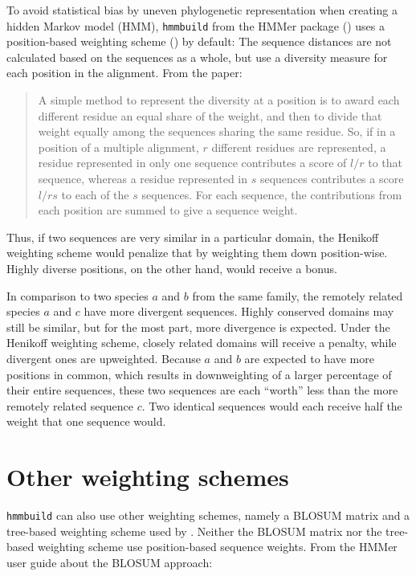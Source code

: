 To avoid statistical bias by uneven phylogenetic representation when creating a
hidden Markov model (HMM), \texttt{hmmbuild} from the HMMer package
(\cite{eddy2009}) uses a position-based weighting scheme (\cite{henikoff1994})
by default: The sequence distances are not calculated based on the sequences as
a whole, but use a diversity measure for each position in the alignment. From
the paper:

\begin{quote}
	A simple method to represent the diversity at a position is to award each
	different residue an equal share of the weight, and then to divide that
	weight equally among the sequences sharing the same residue. So, if in a
	position of a multiple alignment, $r$ different residues are represented, a
	residue represented in only one sequence contributes a score of $l/r$ to that
	sequence, whereas a residue represented in $s$ sequences contributes a score
	$l/rs$ to each of the $s$ sequences. For each sequence, the contributions
	from each position are summed to give a sequence weight.
\end{quote}

Thus, if two sequences are very similar in a particular domain, the Henikoff
weighting scheme would penalize that by weighting them down position-wise.
Highly diverse positions, on the other hand, would receive a bonus. 

In comparison to two species $a$ and $b$ from the same family, the remotely
related species $a$ and $c$ have more divergent sequences. Highly conserved
domains may still be similar, but for the most part, more divergence is
expected. Under the Henikoff weighting scheme, closely related domains will
receive a penalty, while divergent ones are upweighted. Because $a$ and $b$ are
expected to have more positions in common, which results in downweighting of a
larger percentage of their entire sequences, these two sequences are each
``worth'' less than the more remotely related sequence $c$. Two identical
sequences would each receive half the weight that one sequence would.

\section*{Other weighting schemes}

\texttt{hmmbuild} can also use other weighting schemes, namely a BLOSUM matrix
and a tree-based weighting scheme used by \cite{gerstein1994}. Neither the
BLOSUM matrix nor the tree-based weighting scheme use position-based sequence
weights. From the HMMer user guide about the BLOSUM approach:


